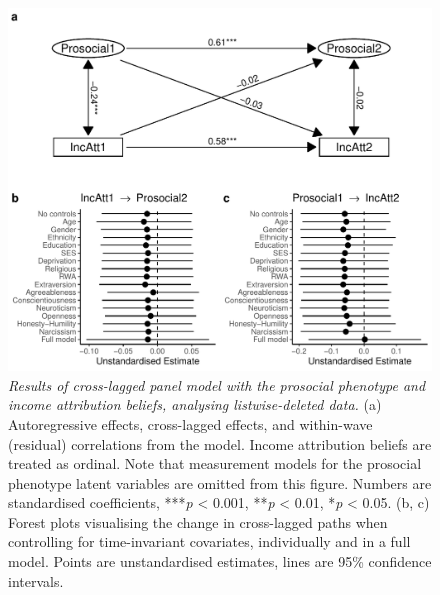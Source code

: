 \documentclass[
  man,floatsintext]{apa6}
\begin{document}
\begin{figure}
\centering
\includegraphics{manuscript_files/figure-latex/clpmPlotIncAttdReduced-1.pdf}
\caption{\label{fig:clpmPlotIncAttdReduced}\emph{Results of cross-lagged panel model with the
prosocial phenotype and income attribution beliefs, analysing listwise-deleted
data.} (a) Autoregressive effects, cross-lagged effects, and within-wave
(residual) correlations from the model. Income attribution beliefs are treated
as ordinal. Note that measurement models for the prosocial phenotype latent
variables are omitted from this figure. Numbers are standardised coefficients,
***\emph{p} \textless{} 0.001, **\emph{p} \textless{} 0.01, *\emph{p} \textless{} 0.05. (b, c) Forest plots visualising
the change in cross-lagged paths when controlling for time-invariant covariates,
individually and in a full model. Points are unstandardised estimates, lines are
95\% confidence intervals.}
\end{figure}

\newpage
\end{document}
